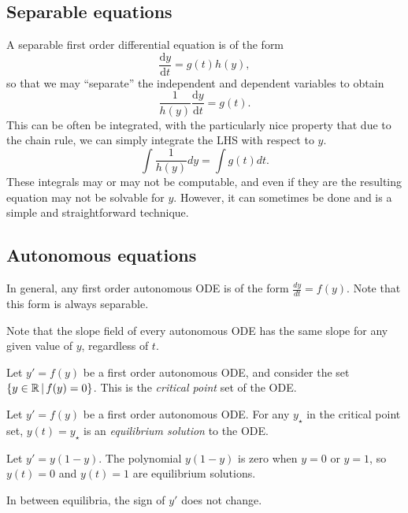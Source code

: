 \subsection{Separable equations}

A separable first order differential equation is of the form
\[\frac{\mathrm{d}y}{\mathrm{d}t} = g(t)h(y),\] so that we may ``separate'' the independent and dependent variables to obtain
\[\frac{1}{h(y)}\frac{\mathrm{d}y}{\mathrm{d}t} = g(t).\] This can be often be integrated, with the particularly nice property that due to the chain rule, we can simply integrate the LHS with respect to $y$.
\[\int \frac{1}{h(y)}dy = \int g(t)dt.\] These integrals may or may not be computable, and even if they are the resulting equation may not be solvable for $y$. However, it can sometimes be done and is a simple and straightforward technique.

\subsection{Autonomous equations}

In general, any first order autonomous ODE is of the form $\frac{dy}{dt} = f(y)$. Note that this form is always separable.

\begin{rmk}
    Note that the slope field of every autonomous ODE has the same slope for any given value of $y$, regardless of $t$.
\end{rmk}

\begin{defn}
    Let $y' = f(y)$ be a first order autonomous ODE, and consider the set $\left\{y \in \mathbb{R} \,\middle|\, f(y) = 0 \right\}$. This is the \emph{critical point} set of the ODE.
\end{defn}

\begin{defn}
    Let $y' = f(y)$ be a first order autonomous ODE. For any $y_{\star}$ in the critical point set, $y(t) = y_{\star}$ is an \emph{equilibrium solution} to the ODE.
\end{defn}

\begin{exmp}
    Let $y' = y(1-y)$. The polynomial $y(1-y)$ is zero when $y = 0$ or $y = 1$, so $y(t) = 0$ and $y(t) = 1$ are equilibrium solutions.
\end{exmp}

\begin{rmk}
    In between equilibria, the sign of $y'$ does not change.
\end{rmk}

